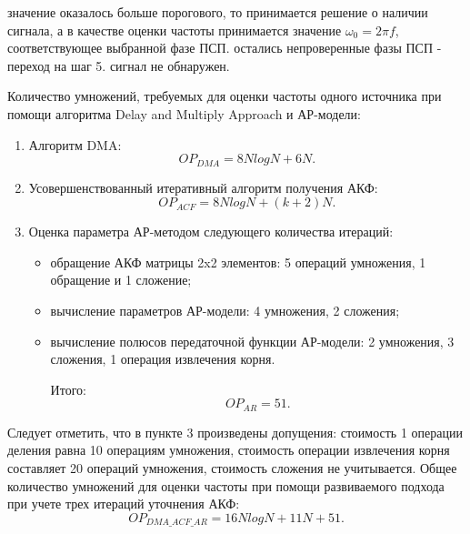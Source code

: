 \begin{itemize}[align=left,style=nextline,leftmargin=*,labelsep=\parindent,font=\normalfont]
	 значение оказалось больше порогового, то принимается решение о наличии сигнала, а в качестве оценки частоты принимается значение ${\omega_0 = 2 \pi f}$,
		соответствующее выбранной фазе ПСП.
		 остались непроверенные фазы ПСП - переход на шаг 5. 
		 сигнал не обнаружен. 
\end{itemize}

Количество умножений, требуемых для оценки частоты одного источника при помощи алгоритма Delay and Multiply Approach и АР-модели:
\begin{enumerate}
\item Алгоритм DMA:
	\begin{equation}
		OP_{DMA} = 8NlogN + 6N.
	\end{equation}
\item Усовершенствованный итеративный алгоритм получения АКФ:
	\begin{equation}
		OP_{ACF} = 8NlogN + (k+2)N.
	\end{equation}
\item Оценка параметра АР-методом следующего количества итераций:
	\begin{itemize}
		\item обращение АКФ матрицы 2x2 элементов: 5 операций умножения, 1 обращение и 1 сложение;
		\item вычисление параметров АР-модели: 4 умножения, 2 сложения;
		\item вычисление полюсов передаточной функции АР-модели: 2 умножения, 3 сложения, 1 операция извлечения корня.

			Итого: 
			\begin{equation}
				OP_{AR} = 51.
			\end{equation}
	\end{itemize}
\end{enumerate}

Следует отметить, что в пункте 3 произведены допущения: стоимость 1 операции деления равна 10 операциям умножения, стоимость операции извлечения
корня составляет 20 операций умножения, стоимость сложения не учитывается.
Общее количество умножений для оценки частоты при помощи развиваемого подхода при учете трех итераций уточнения АКФ:
\begin{equation}
	OP_{DMA\_ACF\_AR} = 16NlogN + 11N + 51.
\end{equation}

